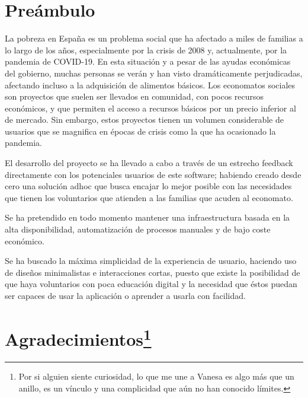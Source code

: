 
\chapter*{Preámbulo}
\thispagestyle{empty}
\par La pobreza en España es un problema social que ha afectado a miles de familias a lo largo de los años, especialmente por la crisis de 2008 y, actualmente, por la pandemia de COVID-19.
En esta situación y a pesar de las ayudas económicas del gobierno, muchas personas se verán y han visto dramáticamente perjudicadas, afectando incluso a la adquisición de alimentos básicos.
Los economatos sociales son proyectos que suelen ser llevados en comunidad, con pocos recursos económicos, y que permiten el acceso a recursos básicos por un precio inferior al de mercado. Sin embargo, estos proyectos tienen un volumen considerable de usuarios que se magnifica en épocas de crisis como la que ha ocasionado la pandemia.

\par El desarrollo del proyecto se ha llevado a cabo a través de un estrecho feedback directamente con los potenciales usuarios de este software; habiendo creado desde cero una solución adhoc que busca encajar lo mejor posible con las necesidades que tienen los voluntarios que atienden a las familias que acuden al economato.
\par Se ha pretendido en todo momento mantener una infraestructura basada en la alta disponibilidad, automatización de procesos manuales y de bajo coste económico.
\par Se ha buscado la máxima simplicidad de la experiencia de usuario, haciendo uso de diseños minimalistas e interacciones cortas, puesto que existe la posibilidad de que haya voluntarios con poca educación digital y la necesidad que éstos puedan ser capaces de usar la aplicación o aprender a usarla con facilidad.

\cleardoublepage %
\chapter*{Agradecimientos\footnote{Por si alguien siente curiosidad, lo que me une a Vanesa es algo más que un anillo, es un vínculo y una complicidad que aún no han conocido límites.}
}

